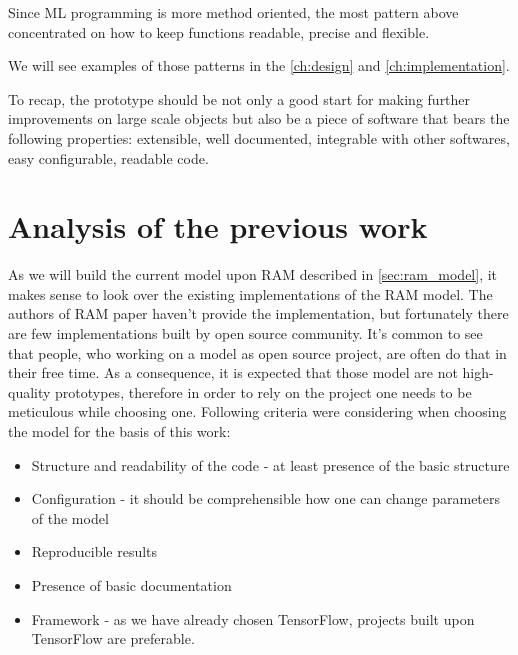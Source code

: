 {%
Since ML programming is more method oriented, the most pattern above concentrated
on how to keep functions readable, precise and flexible.

We will see examples of those patterns in the \autoref{ch:design}
and \autoref{ch:implementation}.

To recap, the prototype should be not only a good start for making further
improvements on large scale objects but also be a piece of software that bears the
following properties: extensible, well documented, integrable with other
softwares, easy configurable, readable code.


\section{Analysis of the previous work}
As we will build the current model upon RAM described
in \autoref{sec:ram_model}, it makes sense to look over the existing implementations
of the RAM model.
The authors of RAM paper haven't provide the implementation, but
fortunately there are few implementations built by open source community.
It's common to see that people, who working on a model as open source project,
are often do that in their free time. As a consequence, it is expected that those model
are not high-quality prototypes, therefore in order to rely on the project
one needs to be meticulous while choosing one.
Following criteria were considering when choosing the model for the basis
of this work:

\begin{itemize}
	\item Structure and readability of the code - at least presence of the basic structure
	\item Configuration - it should be comprehensible how one can change parameters
		of the model
	\item Reproducible results
	\item Presence of basic documentation
	\item Framework - as we have already chosen TensorFlow, projects built upon
		TensorFlow are preferable.
\end{itemize}

}
